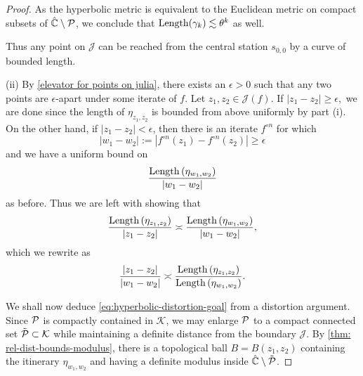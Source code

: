 \begin{proof}
As the hyperbolic metric is equivalent to the Euclidean metric on compact subsets
of $\hat{\mathbb C} \setminus \operatorname{\mathcal P}$,
we conclude that $\operatorname{Length}(\gamma_k) \lesssim \theta^k$ as well.

Thus any point on $\mathcal J$ can be reached from the central station 
$s_{0,0}$ by a curve of bounded length.

(ii) By \cref{elevator for points on julia}, 
there exists an $\epsilon>0$ such that any two points are $\epsilon$-apart 
under some iterate of $f$. 
Let $z_{1},z_{2}\in\mathcal{J}(f)$. If $\left|z_{1}-z_{2}\right|\geq\epsilon,$ 
we are done since the length of $\eta_{z_1,z_2}$ is bounded from above uniformly by part (i).
On the other hand, if 
$\left|z_{1}-z_{2}\right|<\epsilon$,
then there is an iterate $f^{\circ n}$ for which
\begin{equation}
	|w_1-w_2|:=\left|f^{\circ n}(z_{1})-f^{\circ n}(z_{2})\right|\geq\epsilon
\end{equation}
and we have a uniform bound on
$$\frac{\operatorname{Length}\left(\eta_{w_1,w_2}\right)}{|w_1-w_2|}$$ as before.
Thus we are left with showing that
\begin{equation}
	\frac{\operatorname{Length}\left(\eta_{z_{1},z_{2}}\right)}{|z_1-z_2|}\asymp\frac{\operatorname{Length}\left(\eta_{w_1,w_2}\right)}{|w_1-w_2|},
\end{equation}
which we rewrite as
\begin{equation} \label{eq:hyperbolic-distortion-goal}
	\frac{|z_1-z_2|}{|w_1-w_2|}
	\asymp
	\frac{\operatorname{Length}\left(\eta_{z_{1},z_{2}}\right)}{\operatorname{Length}\left(\eta_{w_1,w_2}\right)}.
\end{equation}

We shall now deduce \cref{eq:hyperbolic-distortion-goal} from a distortion argument.
Since $\operatorname{\mathcal P}$ is compactly contained in $\mathcal K$, we may enlarge $\operatorname{\mathcal P}$ to a compact connected set 
$\tilde {\operatorname{\mathcal P}} \subset \mathcal K$ while maintaining a definite distance from the boundary $\mathcal J$.
By \cref{thm: rel-dist-bounds-modulus},
there is a topological ball $B=B(z_1,z_2)$ containing the itinerary $\eta_{w_1,w_2}$ and having
a definite modulus inside $\hat{\mathbb C }\setminus \tilde{\operatorname{\mathcal P}}$.


\end{proof}
